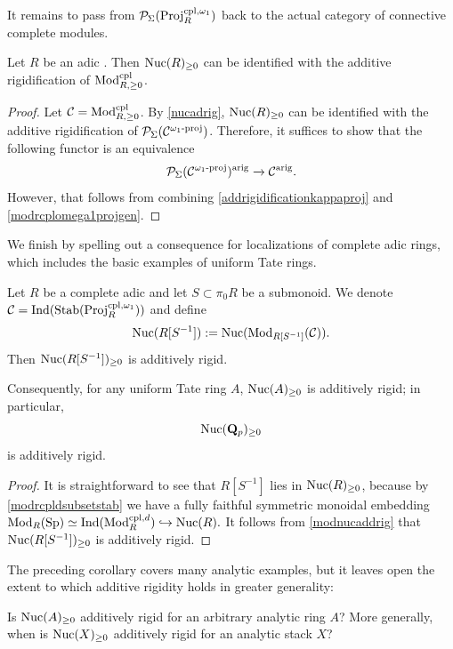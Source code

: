 \documentclass[a4paper,10pt, oneside]{amsart}
\begin{document}
	It remains to pass from  \(\mathcal{P}_{\Sigma}(\mathrm{Proj}_R^{\mathrm{cpl},\omega_1})\) back to the actual  category of connective complete modules.
	\begin{thm}\label{main5}
		Let $R$ be an adic \einfring. Then $\mathrm{Nuc}(R)_{\geq 0}$ can be identified with the additive rigidification of $\mathrm{Mod}_{R,\geq 0}^{\mathrm{cpl}}$. 	
	\end{thm}
	\begin{proof}
		Let $\mathcal{C}=\mathrm{Mod}_{R,\geq 0}^{\mathrm{cpl}}$. By \cref{nucadrig}, $\mathrm{Nuc}(R)_{\geq0}$ can be identified with the additive rigidification of $\mathcal{P}_{\Sigma}(\mathcal{C}^{\omega_1\text{-}\mathrm{proj}})$.
		Therefore,  it suffices to show that the following functor is an equivalence $$\mathcal{P}_{\Sigma}(\mathcal{C}^{\omega_1\text{-}\mathrm{proj}})^{\mathrm{arig}}\xrightarrow{}\mathcal{C}^{\mathrm{arig}}.$$ However, that follows from combining 	\cref{addrigidificationkappaproj} and
		\cref{modrcplomega1projgen}.
	\end{proof} 

We finish by spelling out a consequence for localizations of complete adic rings, which includes the basic examples of uniform Tate rings.
	\begin{cor}\label{main6}
		Let $R$ be a complete adic \einfring and let $S\subset\pi_0R$ be a submonoid. We denote $\mathcal{C}=\mathrm{Ind}(\mathrm{Stab}(\mathrm{Proj}_R^{\mathrm{cpl},\omega_1}))$ and define
		\[
		\mathrm{Nuc}(R[S^{-1}]):=\mathrm{Nuc}(\operatorname{Mod}_{R[S^{-1}]}(\mathcal{C})).
		\]
		Then 	$\mathrm{Nuc}(R[S^{-1}])_{\geq0}$ is additively rigid.
		
		Consequently, for any uniform Tate ring $A$, $\mathrm{Nuc}(A)_{\geq0}$ is additively rigid; in particular, $$\mathrm{Nuc}(\mathbf{Q}_p)_{\geq0}$$ is additively rigid.
		
	\end{cor}

	\begin{proof}
		 It is straightforward to see that $R[S^{-1}]$ lies in $\mathrm{Nuc}(R)_{\geq0}$, because by \cref{modrcpldsubsetstab} we have a fully faithful symmetric monoidal embedding $\operatorname{Mod}_R(\mathrm{Sp})\simeq\mathrm{Ind}(\operatorname{Mod}_R^{\mathrm{cpl},d})\hookrightarrow \mathrm{Nuc}(R).$
		 It follows from \cref{modnucaddrig} that $\mathrm{Nuc}(R[S^{-1}])_{\geq0}$ is additively rigid.
	\end{proof}

		The preceding corollary covers many analytic examples, but it leaves open the extent to which additive rigidity holds in greater generality:
	\begin{quest}
		Is $\mathrm{Nuc}(A)_{\geq0}$ additively rigid for an arbitrary analytic ring $A$? More generally, when is $\mathrm{Nuc}(X)_{\geq0}$ additively rigid for an analytic stack $X$?
	\end{quest}
	
\end{document}
